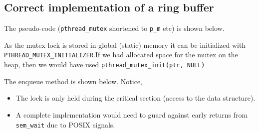 \subsection{Correct implementation of a ring
buffer}\label{correct-implementation-of-a-ring-buffer}

The pseudo-code (\texttt{pthread\_mutex} shortened to \texttt{p\_m} etc)
is shown below.

As the mutex lock is stored in global (static) memory it can be
initialized with \texttt{PTHREAD\_MUTEX\_INITIALIZER}.If we had
allocated space for the mutex on the heap, then we would have used
\texttt{pthread\_mutex\_init(ptr,\ NULL)}

\begin{Shaded}
\begin{Highlighting}[]

 
 

 
  \NormalTok{, }\NormalTok{)}
  \NormalTok{, }\NormalTok{)}
\NormalTok{\}}
\end{Highlighting}
\end{Shaded}

The enqueue method is shown below. Notice,

\begin{itemize}
\itemsep1pt\parskip0pt
\item
  The lock is only held during the critical section (access to the data
  structure).
\item
  A complete implementation would need to guard against early returns
  from \texttt{sem\_wait} due to POSIX signals.
\end{itemize}

\begin{Shaded}
\begin{Highlighting}[]
 

 \NormalTok{b[ (in++) & (N}\NormalTok{) ] = value}

\NormalTok{\}}
\end{Highlighting}
\end{Shaded}

